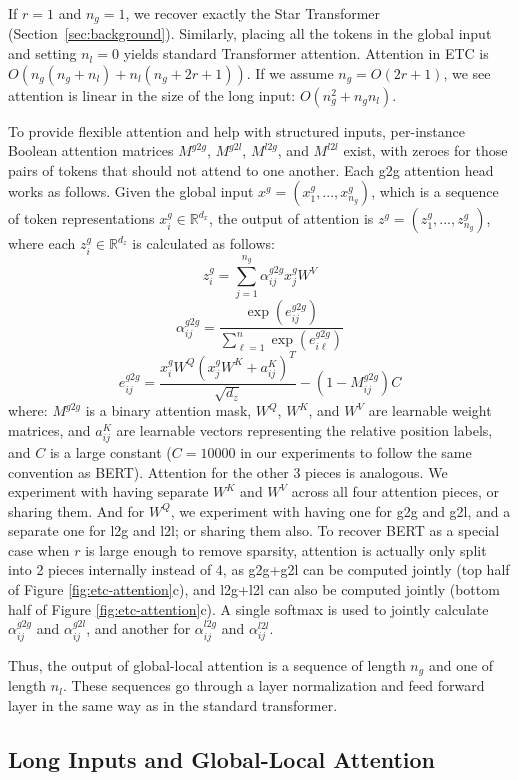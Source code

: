 \documentclass[11pt,a4paper]{article}
\begin{document}
If $r = 1$ and $n_g = 1$, we recover exactly the Star Transformer (Section~\ref{sec:background}). Similarly, placing all the tokens in the global input and setting $n_l = 0$ yields standard Transformer attention. Attention in ETC is $O(n_g (n_g + n_l) + n_l (n_g + 2r+1 ))$. If we assume $n_g = O(2r+1)$, we see attention is linear in the size of the long input: $O(n_g^2 + n_g n_l)$.

To provide flexible attention and help with structured inputs, per-instance Boolean attention matrices $M^{g2g}$, $M^{g2l}$, $M^{l2g}$, and $M^{l2l}$ exist, with zeroes for those pairs of tokens that should not attend to one another. 
Each g2g attention head works as follows. Given the global input $x^g = (x^g_1, ..., x^g_{n_g})$, which is a sequence of token representations $x^g_i \in \mathbb{R}^{d_x}$, the output of attention is $z^g = (z^g_1, ..., z^g_{n_g})$, where each $z^g_i \in \mathbb{R}^{d_z}$ is calculated as follows:
\[z^g_i = \sum_{j=1}^{n_g} \alpha^{g2g}_{ij} x^g_j W^V\]
\[\alpha^{g2g}_{ij} = \frac{\exp(e^{g2g}_{ij})}{\sum_{\ell=1}^n \exp(e^{g2g}_{i\ell})}\]
\[e^{g2g}_{ij} = \frac{x^g_i W^Q (x^g_j W^K + a_{ij}^K)^T}{\sqrt{d_z}} - (1 - M^{g2g}_{ij})C\]
\noindent where: $M^{g2g}$ is a binary attention mask, $W^Q$, $W^K$, and $W^V$ are learnable weight matrices, and $a_{ij}^K$ are learnable vectors representing the relative position labels, and $C$ is a large constant ($C = 10000$ in our experiments to follow the same convention as BERT). Attention for the other 3 pieces is analogous. We experiment with having separate $W^K$ and $W^V$ across all four attention pieces, or sharing them. And for $W^Q$, we experiment with having one for g2g and g2l, and a separate one for l2g and l2l; or sharing them also. To recover BERT as a special case when $r$ is large enough to remove sparsity, attention is actually only split into 2 pieces internally instead of 4, as g2g+g2l can be computed jointly (top half of Figure \ref{fig:etc-attention}c), and l2g+l2l can also be computed jointly (bottom half of Figure \ref{fig:etc-attention}c). A single softmax is used to jointly calculate $\alpha^{g2g}_{ij}$ and $\alpha^{g2l}_{ij}$, and another for $\alpha^{l2g}_{ij}$ and $\alpha^{l2l}_{ij}$.

Thus, the output of global-local attention is a sequence of length $n_g$ and one of length $n_l$. These sequences go through a layer normalization and feed forward layer in the same way as in the standard transformer. 




\subsection{Long Inputs and Global-Local Attention}\label{subsec:longinputs}
\end{document}
